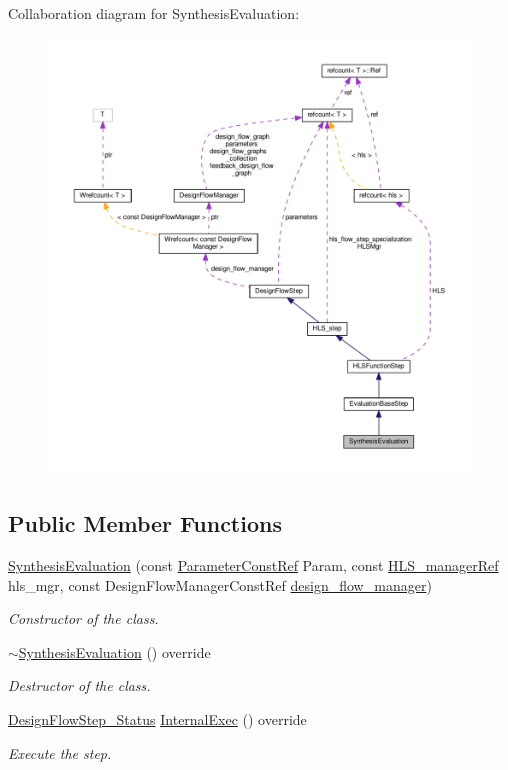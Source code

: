 Collaboration diagram for Synthesis\+Evaluation\+:
\nopagebreak
\begin{figure}[H]
\begin{center}
\leavevmode
\includegraphics[width=350pt]{d9/de7/classSynthesisEvaluation__coll__graph}
\end{center}
\end{figure}
\subsection*{Public Member Functions}
\begin{DoxyCompactItemize}
\item 
\hyperlink{classSynthesisEvaluation_aab6715194330034735598d4c877d84ca}{Synthesis\+Evaluation} (const \hyperlink{Parameter_8hpp_a37841774a6fcb479b597fdf8955eb4ea}{Parameter\+Const\+Ref} Param, const \hyperlink{hls__manager_8hpp_acd3842b8589fe52c08fc0b2fcc813bfe}{H\+L\+S\+\_\+manager\+Ref} hls\+\_\+mgr, const Design\+Flow\+Manager\+Const\+Ref \hyperlink{classDesignFlowStep_ab770677ddf087613add30024e16a5554}{design\+\_\+flow\+\_\+manager})
\begin{DoxyCompactList}\small\item\em Constructor of the class. \end{DoxyCompactList}\item 
\hyperlink{classSynthesisEvaluation_a27beacf8d148b14fa4508a6e701a34fd}{$\sim$\+Synthesis\+Evaluation} () override
\begin{DoxyCompactList}\small\item\em Destructor of the class. \end{DoxyCompactList}\item 
\hyperlink{design__flow__step_8hpp_afb1f0d73069c26076b8d31dbc8ebecdf}{Design\+Flow\+Step\+\_\+\+Status} \hyperlink{classSynthesisEvaluation_a0086eea12b3721703d95d0031ed54257}{Internal\+Exec} () override
\begin{DoxyCompactList}\small\item\em Execute the step. \end{DoxyCompactList}\end{DoxyCompactItemize}
